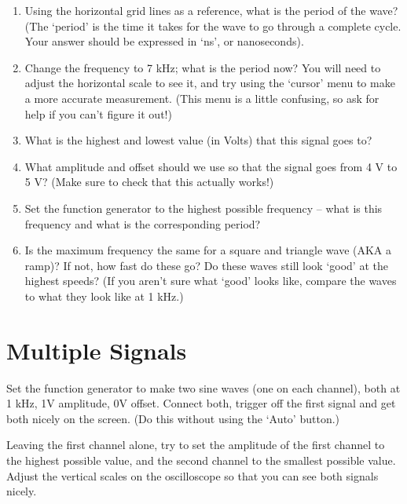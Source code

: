 \documentclass[12pt, letterpaper]{article}
\begin{document}
\begin{enumerate}
	\item Using the horizontal grid lines as a reference, what is the period of the wave?
	(The `period' is the time it takes for the wave to go through a complete cycle.  Your answer should be expressed in `ns', or nanoseconds).

	\answergrid{2cm} 
	\item Change the frequency to 7 kHz; what is the period now?
	You will need to adjust the horizontal scale to see it, and try using the `cursor' menu to make a more accurate measurement.  (This menu is a little confusing, so ask for help if you can't figure it out!)

	\answergrid{2cm}\clearpage
	\item What is the highest and lowest value (in Volts) that this signal goes to? 
	
	\answergrid{2cm}
	\item What amplitude and offset should we use so that the signal goes from 4 V to 5 V?  (Make sure to check that this actually works!)
	
	\answergrid{2cm}
	\item Set the function generator to the highest possible frequency -- what is this frequency and what is the corresponding period?
	
	\answergrid{2cm}
	\item Is the maximum frequency the same for a square and triangle wave (AKA a ramp)?  If not, how fast do these go?  Do these waves still look `good' at the highest speeds?  (If you aren't sure what `good' looks like, compare the waves to what they look like at 1 kHz.)
	
	\answergrid{4cm}
\end{enumerate}

\section{Multiple Signals}

Set the function generator to make two sine waves (one on each channel), both at 1 kHz, 1V amplitude, 0V offset.  Connect both, trigger off the first signal and get both nicely on the screen.
(Do this without using the `Auto' button.)

Leaving the first channel alone, try to set the amplitude of the first channel to the highest possible value, and the second channel to the smallest possible value.  
Adjust the vertical scales on the oscilloscope so that you can see both signals nicely.
\end{document}
